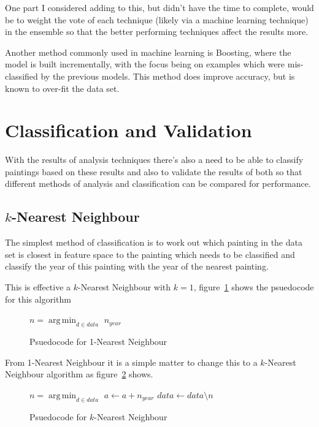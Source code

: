 One part I considered adding to this, but didn't have the time to complete, would be to weight the
vote of each technique (likely via a machine learning technique) in the ensemble so that the 
better performing techniques affect the results more.

Another method commonly used in machine learning is Boosting, where the model is built 
incrementally, with the focus being on examples which were mis-classified by the previous models.
This method does improve accuracy, but is known to over-fit the data set. 


\section{Classification and Validation}
With the results of analysis techniques there's also a need to be able to classify paintings based
on these results and also to validate the results of both so that different methods of analysis
and classification can be compared for performance.

\subsection{$k$-Nearest Neighbour}
The simplest method of classification is to work out which painting in the data set is closest in
feature space to the painting which needs to be classified and classify the year of this painting
with the year of the nearest painting.

This is effective a $k$-Nearest Neighbour with $k=1$, figure~\ref{fig:1nn} shows the psuedocode
for this algorithm

\begin{figure}[h]
\begin{algorithmic}
\State $n = \operatorname*{arg\,min}_{d \in data}$ 
\State\Return $n_{year}$
\EndFunction
\end{algorithmic}
\caption{Psuedocode for 1-Nearest Neighbour}\label{fig:1nn}
\end{figure}

From 1-Nearest Neighbour it is a simple matter to change this to a $k$-Nearest Neighbour algorithm
as figure~\ref{fig:knn} shows.

\begin{figure}[h]
\begin{algorithmic}
\State $n = \operatorname*{arg\,min}_{d \in data}$ 
\State $a \gets a + n_{year}$
\State $data \gets data \setminus n$
\EndFor
\State \Return {}
\EndFunction
\end{algorithmic}
\caption{Psuedocode for $k$-Nearest Neighbour}\label{fig:knn}
\end{figure}

